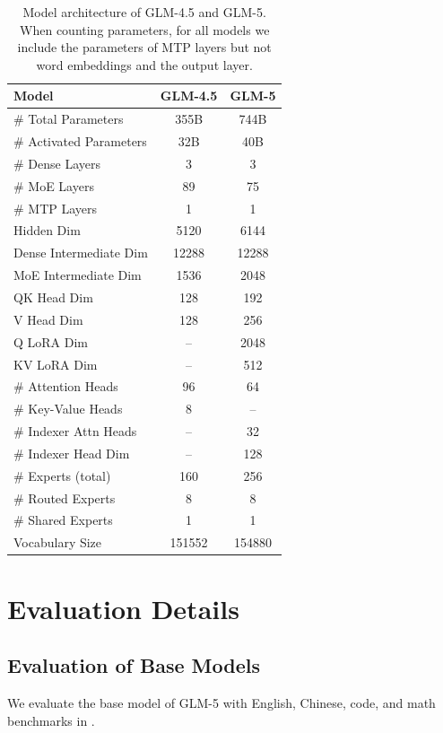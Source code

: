 \documentclass{article}
\theoremstyle{definition}
\begin{document}
\begin{table}[!ht]
    \centering
    \caption{Model architecture of GLM-4.5 and GLM-5. When counting parameters, for all models we include the parameters of MTP layers but not word embeddings and the output layer.}
    \label{tab:model_arch_glm45_glm5}
    \begin{tabular}{l|cc}
    \toprule
       Model & \textbf{GLM-4.5} & \textbf{GLM-5} \\
    \midrule
       \# Total Parameters & 355B & 744B \\
       \# Activated Parameters & 32B & 40B \\
       \# Dense Layers & 3 & 3 \\
       \# MoE Layers & 89 & 75 \\
       \# MTP Layers & 1 & 1 \\
       Hidden Dim & 5120 & 6144 \\
       Dense Intermediate Dim & 12288 & 12288 \\
       MoE Intermediate Dim & 1536 & 2048 \\
    \midrule
       QK Head Dim & 128 & 192 \\
       V Head Dim & 128 & 256 \\
       Q LoRA Dim & -- & 2048 \\
       KV LoRA Dim & -- & 512 \\
       \# Attention Heads & 96 & 64 \\
       \# Key-Value Heads & 8 & -- \\
       \# Indexer Attn Heads & -- & 32 \\
       \# Indexer Head Dim & -- & 128 \\
    \midrule
       \# Experts (total) & 160 & 256 \\
       \# Routed Experts & 8 & 8 \\
       \# Shared Experts & 1 & 1 \\
    \midrule
       Vocabulary Size & 151552 & 154880 \\
    \bottomrule
    \end{tabular}
\end{table}

\section{Evaluation Details}
\subsection{Evaluation of Base Models}
We evaluate the base model of GLM-5 with English, Chinese, code, and math benchmarks in .
\end{document}
